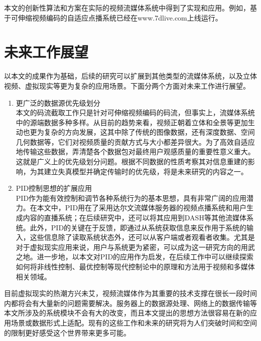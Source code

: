 本文的创新性算法和方案在实际的视频流媒体系统中得到了实现和应用。例如，基于可伸缩视频编码的自适应点播系统已经在www.7dlive.com上线运行。

\section{未来工作展望}

以本文的成果作为基础，后续的研究可以扩展到其他类型的流媒体系统，以及立体视频、虚拟现实等更为复杂的应用场景。下面分两个方面对未来工作进行展望。
\begin{enumerate}
\item {更广泛的数据源优先级划分} \\
本文的码流截取工作只是针对可伸缩视频编码的码流，但事实上，流媒体系统中的源端数据多种多样。从目前的趋势来看，视频正朝着立体和全景等更加生动也更为复杂的方向发展，这其中除了传统的图像数据，还有深度数据、空间几何数据等，它们对视频质量的贡献方式与大小都差异很大。为了高效自适应地传输这些数据，弄清楚各个数据包对最终用户观感质量的重要性意义重大。这就是广义上的优先级划分问题。根据不同数据的性质考察其对信息重建的影响，为其建立失真模型并确定传输时的优先级，将是未来研究的内容之一。
\item {PID控制思想的扩展应用} \\
PID作为能有效控制和调节各种系统行为的基本思想，具有非常广阔的应用潜力。在本文中，PID用在了采用达尔文流媒体服务器的视频点播系统和用户生成内容的直播系统；在后续研究中，还可以将其应用到DASH等其他流媒体系统。此外，PID的关键在于反馈，即通过从系统获取信息来反作用于系统的输入，这些信息除了读取系统状态外，还可以从客户端或者观看者收集。尤其是对于虚拟现实应用来说，用户与系统更为紧密，可以成为这一研究方向的用武之地。进一步地，以本文对PID的应用作为启发，在后续工作中可以继续探索如何将非线性控制、最优控制等现代控制论中的原理和方法用于视频和多媒体相关领域。
\end{enumerate}

目前虚拟现实的热潮方兴未艾，视频流媒体作为其重要的技术支撑在很长一段时间内都将会有大量新的问题需要解决。服务器上的数据源处理、网络上的数据传输等本文所涉及的系统模块不会有大的改变，而且本文提出的思想方法很容易在新的应用场景或数据形式上适配。现有的这些工作和未来的研究将为人们突破时间和空间的限制更好感受这个世界带来更多可能。